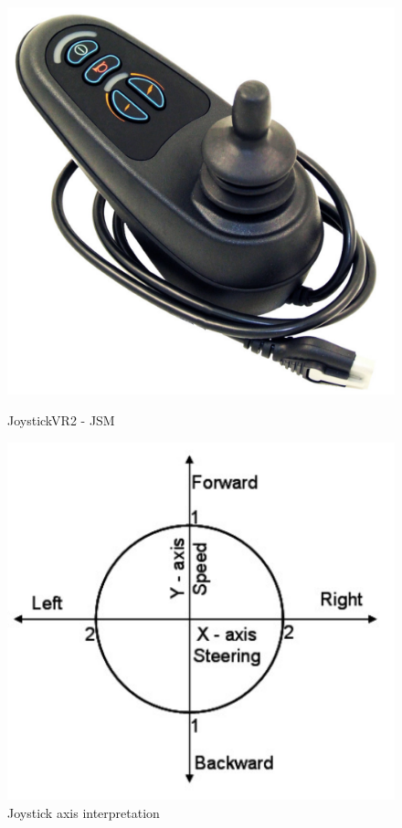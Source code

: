 \begin{figure}[!h]
\center
\begin{minipage}{0.45\linewidth}
\center
\captionsetup{justification=centering,margin=0.5cm,font=small}
\includegraphics[width=0.7\linewidth]{img/cap2/joystickvr2}
\caption{ JoystickVR2 - JSM  \cite{joystickvr2jsm}} \label{subfig:joystickvr2}
\end{minipage}
\begin{minipage}{0.45\linewidth}
\center
\captionsetup{justification=centering,margin=0cm,font=small}
\includegraphics[width=0.8\linewidth]{img/cap2/joyscoord}
\caption{ Joystick axis interpretation \cite{fattouh2004}} \label{subfig:joyscoord}
\end{minipage}
\end{figure}

